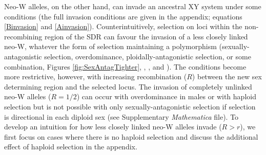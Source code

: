 \documentclass[10pt,letterpaper]{article}
\begin{document}
Neo-W alleles, on the other hand, can invade an ancestral XY system under some conditions (the full invasion conditions are given in the appendix; equations \ref{Binvasion} and \ref{Ainvasion}). 
Counterintuitively, selection on loci within the non-recombining region of the SDR can favour the invasion of a less closely linked neo-W, whatever the form of selection maintaining a polymorphism (sexually-antagonistic selection, overdominance, ploidally-antagonistic selection, or some combination, Figures \ref{fig:SexAntagTighter}, , , and ).  
The conditions become more restrictive, however, with increasing recombination ($R$) between the new sex determining region and the selected locus.  
The invasion of completely unlinked neo-W alleles ($R = 1/2$) can occur with overdominance in males or with haploid selection but is not possible with only sexually-antagonistic selection if selection is directional in each diploid sex (see Supplementary \textit{Mathematica} file).
To develop an intuition for how less closely linked neo-W alleles invade ($R>r$), we first focus on cases where there is no haploid selection and discuss the additional effect of haploid selection in the appendix. 
\end{document}
